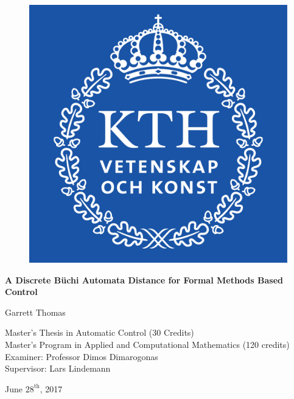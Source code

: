 \begin{figure}[!htb]
\centering
\includegraphics[scale=0.4]{kth_logo}
\end{figure} 

{
\centering 

\vspace*{2\baselineskip}

\textbf{\Large A Discrete B\"uchi Automata Distance for Formal Methods Based Control}

\vspace*{3\baselineskip}

{\large Garrett Thomas}

\vspace*{\baselineskip}

%

{\small Master's Thesis in Automatic Control (30 Credits) \\ Master's Program in Applied and Computational Mathematics (120 credits) \\ Examiner: Professor Dimos Dimarogonas \\ Supervisor: Lars Lindemann }

\vspace*{3\baselineskip}

{June $28^{\text{th}}$, 2017}
\par
}